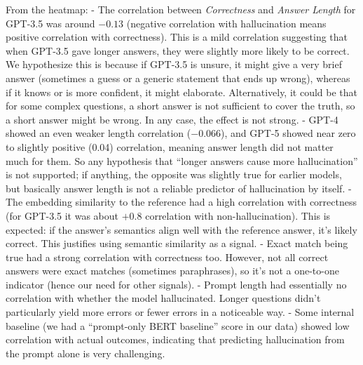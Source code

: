 \documentclass{article}
\begin{document}
From the heatmap:
- The correlation between \textit{Correctness} and \textit{Answer Length} for GPT-3.5 was around $-0.13$ (negative correlation with hallucination means positive correlation with correctness). This is a mild correlation suggesting that when GPT-3.5 gave longer answers, they were slightly more likely to be correct. We hypothesize this is because if GPT-3.5 is unsure, it might give a very brief answer (sometimes a guess or a generic statement that ends up wrong), whereas if it knows or is more confident, it might elaborate. Alternatively, it could be that for some complex questions, a short answer is not sufficient to cover the truth, so a short answer might be wrong. In any case, the effect is not strong. 
- GPT-4 showed an even weaker length correlation ($-0.066$), and GPT-5 showed near zero to slightly positive (0.04) correlation, meaning answer length did not matter much for them. So any hypothesis that “longer answers cause more hallucination” is not supported; if anything, the opposite was slightly true for earlier models, but basically answer length is not a reliable predictor of hallucination by itself.
- The embedding similarity to the reference had a high correlation with correctness (for GPT-3.5 it was about $+0.8$ correlation with non-hallucination). This is expected: if the answer’s semantics align well with the reference answer, it’s likely correct. This justifies using semantic similarity as a signal.
- Exact match being true had a strong correlation with correctness too. However, not all correct answers were exact matches (sometimes paraphrases), so it’s not a one-to-one indicator (hence our need for other signals).
- Prompt length had essentially no correlation with whether the model hallucinated. Longer questions didn’t particularly yield more errors or fewer errors in a noticeable way.
- Some internal baseline (we had a “prompt-only BERT baseline” score in our data) showed low correlation with actual outcomes, indicating that predicting hallucination from the prompt alone is very challenging.
\end{document}

